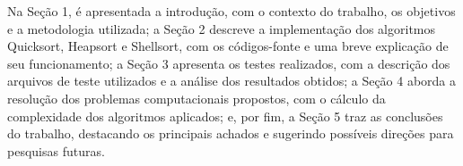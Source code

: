Na Seção 1, é apresentada a introdução, com o contexto do trabalho, os objetivos e a metodologia utilizada; a Seção 2 descreve a implementação dos algoritmos Quicksort, Heapsort e Shellsort, com os códigos-fonte e uma breve explicação de seu funcionamento; a Seção 3 apresenta os testes realizados, com a descrição dos arquivos de teste utilizados e a análise dos resultados obtidos; a Seção 4 aborda a resolução dos problemas computacionais propostos, com o cálculo da complexidade dos algoritmos aplicados; e, por fim, a Seção 5 traz as conclusões do trabalho, destacando os principais achados e sugerindo possíveis direções para pesquisas futuras.




























































































